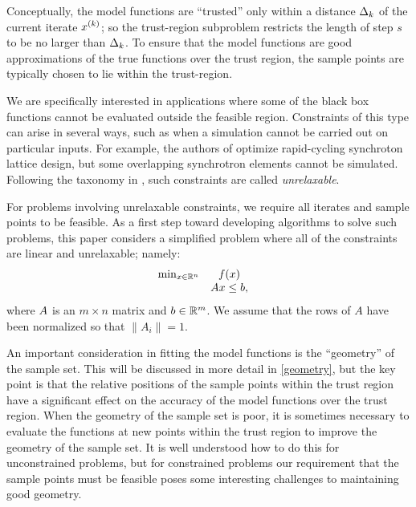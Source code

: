 \documentclass{article}
\begin{document}
Conceptually, the model functions are ``trusted'' only within a distance $ \Delta_k $ of the current iterate $x^{(k)}$; 
so the trust-region subproblem restricts the length of step $s$ to be no larger than $\Delta_k$.
To ensure that the model functions are good approximations of the true functions over the trust region, 
the sample points are typically chosen to lie within the trust-region.

%
We are specifically interested in applications where some of the black box functions cannot be evaluated outside the feasible region.  Constraints of this type can arise in several ways, such as when a simulation cannot be carried out on particular inputs.
For example, the authors of \cite{Padidar2021} optimize rapid-cycling synchroton lattice design,
but some overlapping synchrotron elements cannot be simulated.
Following the taxonomy in \cite{ledigabel2015taxonomy},  such constraints are called {\em unrelaxable}.

For problems involving unrelaxable constraints,  we require all iterates and sample points to be feasible.
As a first step toward developing algorithms to solve such problems, this paper considers a simplified problem where all of the constraints are linear and unrelaxable; namely:
\begin{align}
\begin{array}{ccl} \min_{x \in \mathbb R^n} & f(x) \\
& {A} x \le {b}, & 
\end{array}
\label{linear_dfo_problem}
\end{align}
where ${A}$ is an $m \times n$ matrix and ${b} \in \mathbb R^m$.
\color{magenta}
We assume that the rows of $A$ have been normalized so that $\|A_i\| = 1$.
\color{black}


An important consideration in fitting the model functions is the ``geometry'' of the sample set.
This will be discussed in more detail in \cref{geometry}, but the key point is that the relative positions of the sample points within the trust region have a significant effect on the accuracy of the model functions over the trust region.
When the geometry of the sample set is poor, it is sometimes necessary to evaluate the functions at new points within the trust region to improve the geometry of the sample set.
It is well understood how to do this for unconstrained problems, but for constrained problems
our requirement that the sample points must be feasible poses some interesting challenges to maintaining good geometry.   
\end{document}

